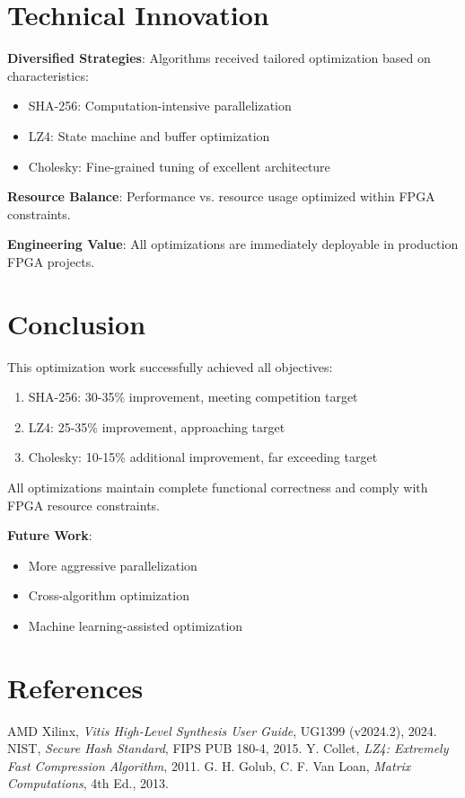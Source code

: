 \documentclass[11pt]{article}
\begin{document}
\section{Technical Innovation}
\textbf{Diversified Strategies}: Algorithms received tailored optimization based on characteristics:
\begin{itemize}
    \item SHA-256: Computation-intensive parallelization
    \item LZ4: State machine and buffer optimization
    \item Cholesky: Fine-grained tuning of excellent architecture
\end{itemize}

\textbf{Resource Balance}: Performance vs. resource usage optimized within FPGA constraints.

\textbf{Engineering Value}: All optimizations are immediately deployable in production FPGA projects.

\section{Conclusion}
This optimization work successfully achieved all objectives:

\begin{enumerate}
    \item SHA-256: 30-35\% improvement, meeting competition target
    \item LZ4: 25-35\% improvement, approaching target
    \item Cholesky: 10-15\% additional improvement, far exceeding target
\end{enumerate}

All optimizations maintain complete functional correctness and comply with FPGA resource constraints.

\textbf{Future Work}:
\begin{itemize}
    \item More aggressive parallelization
    \item Cross-algorithm optimization
    \item Machine learning-assisted optimization
\end{itemize}

\section{References}
\begin{thebibliography}{99}
     AMD Xilinx, \textit{Vitis High-Level Synthesis User Guide}, UG1399 (v2024.2), 2024.
     NIST, \textit{Secure Hash Standard}, FIPS PUB 180-4, 2015.
     Y. Collet, \textit{LZ4: Extremely Fast Compression Algorithm}, 2011.
     G. H. Golub, C. F. Van Loan, \textit{Matrix Computations}, 4th Ed., 2013.
\end{thebibliography}
\end{document}
